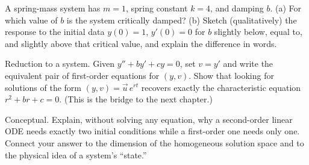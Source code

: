 \begin{exercise}
\label{ch38:ex-10}
A spring-mass system has $m = 1$, spring constant $k = 4$, and damping $b$. (a)
For which value of $b$ is the system critically damped? (b) Sketch (qualitatively)
the response to the initial data $y(0) = 1$, $y'(0) = 0$ for $b$ slightly below,
equal to, and slightly above that critical value, and explain the difference in
words.
\end{exercise}

\begin{exercise}
\label{ch38:ex-11}
Reduction to a system. Given $y'' + b y' + c y = 0$, set $v = y'$ and write the
equivalent pair of first-order equations for $(y, v)$. Show that looking for
solutions of the form $(y, v) = \vec{u}\,e^{rt}$ recovers exactly the
characteristic equation $r^2 + b r + c = 0$. (This is the bridge to the next
chapter.)
\end{exercise}

\begin{exercise}
\label{ch38:ex-12}
Conceptual. Explain, without solving any equation, why a second-order linear ODE
needs exactly two initial conditions while a first-order one needs only one.
Connect your answer to the dimension of the homogeneous solution space and to the
physical idea of a system's ``state.''
\end{exercise}
